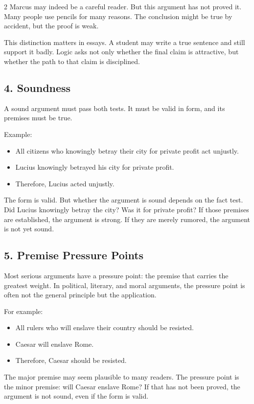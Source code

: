 \documentclass[12pt]{article}
\begin{document}
\begin{multicols}{2}
Marcus may indeed be a careful reader. But this argument has not proved it. Many people use pencils for many reasons. The conclusion might be true by accident, but the proof is weak.

This distinction matters in essays. A student may write a true sentence and still support it badly. Logic asks not only whether the final claim is attractive, but whether the path to that claim is disciplined.

\subsection*{4. Soundness}
A sound argument must pass both tests. It must be valid in form, and its premises must be true.

Example:
\begin{itemize}[leftmargin=*]
\item All citizens who knowingly betray their city for private profit act unjustly.
\item Lucius knowingly betrayed his city for private profit.
\item Therefore, Lucius acted unjustly.
\end{itemize}

The form is valid. But whether the argument is sound depends on the fact test. Did Lucius knowingly betray the city? Was it for private profit? If those premises are established, the argument is strong. If they are merely rumored, the argument is not yet sound.

\subsection*{5. Premise Pressure Points}
Most serious arguments have a pressure point: the premise that carries the greatest weight. In political, literary, and moral arguments, the pressure point is often not the general principle but the application.

For example:
\begin{itemize}[leftmargin=*]
\item All rulers who will enslave their country should be resisted.
\item Caesar will enslave Rome.
\item Therefore, Caesar should be resisted.
\end{itemize}

The major premise may seem plausible to many readers. The pressure point is the minor premise: will Caesar enslave Rome? If that has not been proved, the argument is not sound, even if the form is valid.


\end{multicols}
\end{document}
